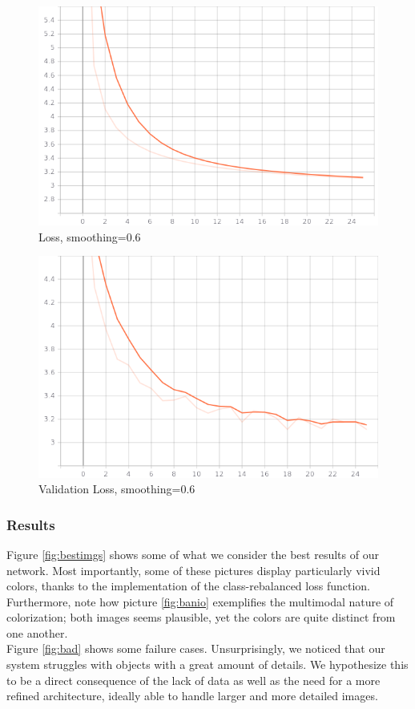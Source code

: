 \documentclass[twoside,twocolumn]{article}
\begin{document}
\begin{figure}[h]
	\includegraphics[width=\linewidth]{img/loss.png}
	\caption{Loss, smoothing=0.6}
	\label{fig:loss}
\end{figure}

\begin{figure}[h]
	\includegraphics[width=\linewidth]{img/val_loss.png}
	\caption{Validation Loss, smoothing=0.6}
	\label{fig:valloss}
\end{figure}

\subsubsection{Results}

Figure \ref{fig:bestimgs} shows some of what we consider the best results of our network. Most importantly, some of these pictures display particularly vivid colors, thanks to the implementation of the class-rebalanced loss function. Furthermore, note how picture \ref{fig:banio} exemplifies the multimodal nature of colorization; both images seems plausible, yet the colors are quite distinct from one another.\\
Figure \ref{fig:bad} shows some failure cases. Unsurprisingly, we noticed that our system struggles with objects with a great amount of details. We hypothesize this to be a direct consequence of the lack of data as well as the need for a more refined architecture, ideally able to handle larger and more detailed images.
\end{document}
